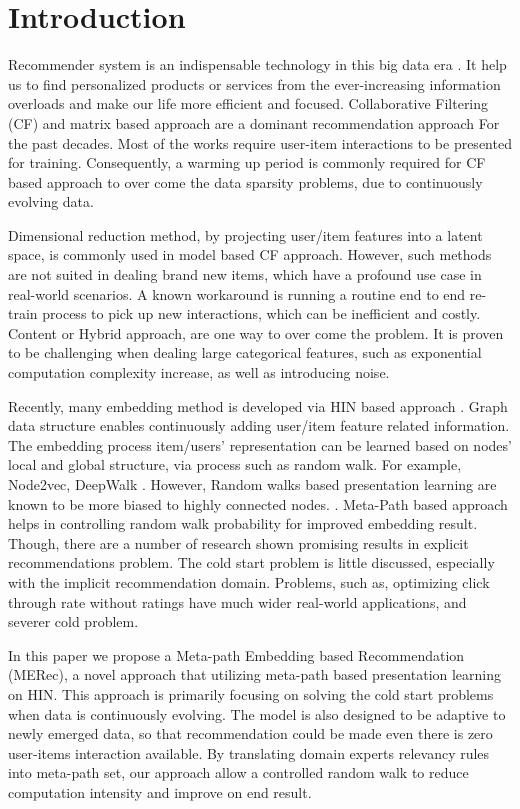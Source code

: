 \section{Introduction}

Recommender system is an indispensable technology in this big data era \cite{lu2015recommender}. It help us to find personalized products or services from the ever-increasing information overloads and make our life more efficient and focused. Collaborative Filtering (CF) and matrix based approach are a dominant recommendation approach For the past decades. Most of the works require user-item interactions to be presented for training. Consequently, a warming up period is commonly required for CF based approach to over come the data sparsity problems, due to continuously evolving data.

Dimensional reduction method, by projecting user/item features into a latent space, is commonly used in model based CF approach. However, such methods are not suited in dealing brand new items, which have a profound use case in real-world scenarios. A known workaround is running a routine end to end re-train process to pick up new interactions, which can be inefficient and costly. Content or Hybrid approach, are one way to over come the problem. It is proven to be challenging when dealing large categorical features, such as exponential computation complexity increase, as well as introducing noise.

Recently, many embedding method is developed via HIN based approach \cite{mao2016multirelational,wang2016member}. Graph data structure enables continuously adding user/item feature related information. The embedding process item/users' representation can be learned based on nodes' local and global structure, via process such as random walk. For example, Node2vec, DeepWalk \cite{grover2016node2vec} \cite{perozzi2014deepwalk}. However, Random walks based presentation learning are known to be more biased to highly connected nodes. \cite{sun2011pathsim}. Meta-Path based approach \cite{dong2017metapath2vec} helps in controlling random walk probability for improved embedding result. Though, there are a number of research shown promising results in explicit recommendations problem. The cold start problem is little discussed, especially with the implicit recommendation domain. Problems, such as, optimizing click through rate without ratings have much wider real-world applications, and severer cold problem. 

In this paper we propose a Meta-path Embedding based Recommendation (MERec), a novel approach that utilizing meta-path based presentation learning on HIN. This approach is primarily focusing on solving the cold start problems when data is continuously evolving. The model is also designed to be adaptive to newly emerged data, so that recommendation could be made even there is zero user-items interaction available. By translating domain experts relevancy rules into meta-path set, our approach allow a controlled random walk to reduce computation intensity and improve on end result. 

